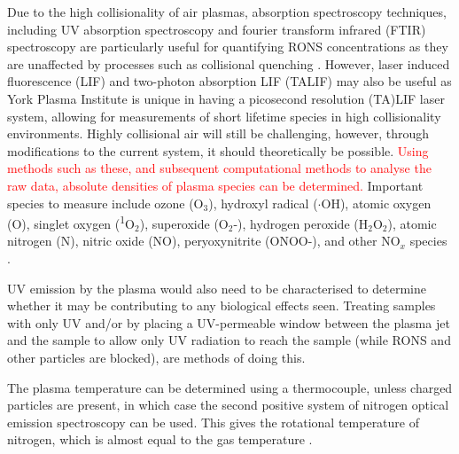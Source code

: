 \documentclass[11pt, oneside]{article}   	%
\begin{document}
Due to the high collisionality of air plasmas, absorption spectroscopy techniques, including UV absorption spectroscopy and fourier transform infrared (FTIR) spectroscopy are particularly useful for quantifying RONS concentrations as they are unaffected by processes such as collisional quenching \cite{Niemi2013absolute, Schroter2015atomic}.
However, laser induced fluorescence (LIF) and two-photon absorption LIF (TALIF) may also be useful as York Plasma Institute is unique in having a picosecond resolution (TA)LIF laser system, allowing for measurements of short lifetime species in high collisionality environments.
Highly collisional air will still be challenging, however, through modifications to the current system, it should theoretically be possible.
\textcolor{red}{Using methods such as these, and subsequent computational methods to analyse the raw data, absolute densities of plasma species can be determined.}
Important species to measure include ozone (O$_3$),  hydroxyl radical ($\cdot$OH), atomic oxygen (O), singlet oxygen (\textsuperscript{1}O$_2$), superoxide (O$_2$-), hydrogen peroxide (H$_2$O$_2$),  atomic nitrogen (N), nitric oxide (NO), peryoxynitrite (ONOO-), and other NO$_x$ species \cite{Graves2014low}. 

UV emission by the plasma would also need to be characterised to determine whether it may be contributing to any biological effects seen.
Treating samples with only UV and/or by placing a UV-permeable window between the plasma jet and the sample to allow only UV radiation to reach the sample (while RONS and other particles are blocked), are methods of doing this.

The plasma temperature can be determined using a thermocouple, unless charged particles are present, in which case the second positive system of nitrogen optical emission spectroscopy can be used.
This gives the rotational temperature of nitrogen, which is almost equal to the gas temperature \cite{Twomey2011correlation}.
\end{document}
